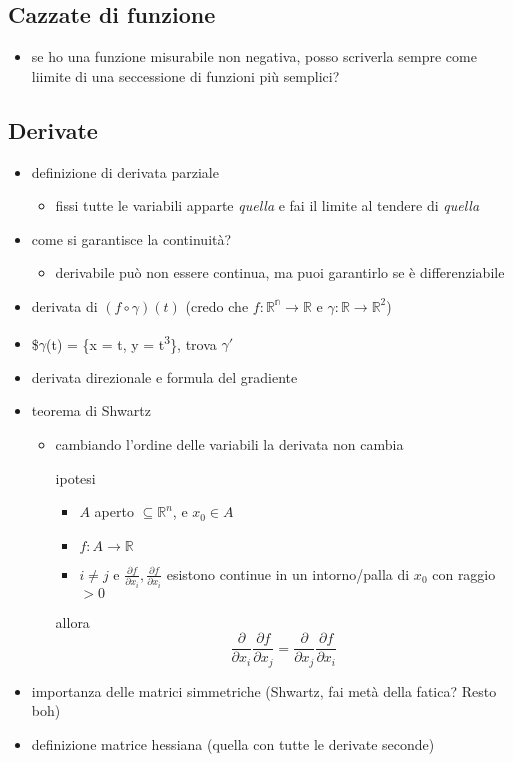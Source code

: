 \documentclass[11pt]{article}
\begin{document}
\subsection{Cazzate di funzione}
\label{sec:org4fcadf7}
\begin{itemize}
\item se ho una funzione misurabile non negativa, posso scriverla sempre come liimite di una
seccessione di funzioni più semplici?
\end{itemize}

\subsection{Derivate}
\label{sec:org190b857}
\begin{itemize}
\item definizione di derivata parziale
\begin{itemize}
\item fissi tutte le variabili apparte \emph{quella} e fai il limite al tendere di \emph{quella}
\end{itemize}
\item come si garantisce la continuità?
\begin{itemize}
\item derivabile può non essere continua, ma puoi garantirlo se è differenziabile
\end{itemize}
\item derivata di \((f \circ \gamma) (t)\) (credo che
\(f : \mathbb{R^n} \to \mathbb{R}\) e
\(\gamma : \mathbb{R} \to \mathbb{R}^2\))
\item \$\(\gamma\)(t) = \{x = t, y = t\textsuperscript{3}\}, trova \(\gamma '\)
\item derivata direzionale e formula del gradiente
\item teorema di Shwartz
\begin{itemize}
\item cambiando l'ordine delle variabili la derivata non cambia
\item[{ipotesi}] \begin{itemize}
\item \(A\) aperto \(\subseteq \mathbb{R}^n\), e \(x_0 \in A\)
\item \(f : A \to \mathbb{R}\)
\item \(i \neq j\) e
\(\frac{\partial f}{\partial x_i}, \frac{\partial f}{\partial x_i}\)
esistono continue in un intorno/palla di \(x_0\) con raggio \(> 0\)
\end{itemize}
\item[{allora}] \[
     \frac{\partial}{\partial x_i} \frac{\partial f}{\partial x_j} =
     \frac{\partial}{\partial x_j} \frac{\partial f}{\partial x_i}
     \]
\end{itemize}
\item importanza delle matrici simmetriche (Shwartz, fai metà della fatica? Resto boh)
\item definizione matrice hessiana
(quella con tutte le derivate seconde)
\end{itemize}
\end{document}
